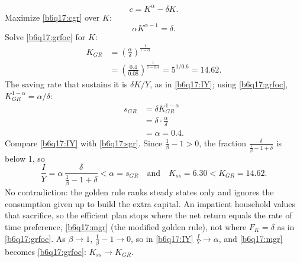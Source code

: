 \begin{sol}
\begin{equation}
c=K^\alpha-\delta K. \label{b6q17:cgr}
\end{equation}
Maximize \eqref{b6q17:cgr} over $K$:
\begin{equation}
\alpha K^{\alpha-1}=\delta. \label{b6q17:grfoc}
\end{equation}
Solve \eqref{b6q17:grfoc} for $K$:
\begin{align}
K_{GR}&=\left(\frac\alpha\delta\right)^{\frac1{1-\alpha}}\nonumber\\
&=\left(\frac{0.4}{0.08}\right)^{\frac1{1-0.4}}=5^{1/0.6}=14.62. \label{b6q17:Kgr}
\end{align}
The saving rate that sustains it is $\delta K/Y$, as in \eqref{b6q17:IY}; using \eqref{b6q17:grfoc}, $K_{GR}^{1-\alpha}=\alpha/\delta$:
\begin{align}
s_{GR}&=\delta K_{GR}^{1-\alpha}\nonumber\\
&=\delta\cdot\frac\alpha\delta\nonumber\\
&=\alpha=0.4. \label{b6q17:sgr}
\end{align}
Compare \eqref{b6q17:IY} with \eqref{b6q17:sgr}. Since $\frac1\beta-1>0$, the fraction $\frac{\delta}{\frac1\beta-1+\delta}$ is below 1, so
\[
\frac IY=\alpha\,\frac{\delta}{\frac1\beta-1+\delta}<\alpha=s_{GR}\quad\text{and}\quad K_{ss}=6.30<K_{GR}=14.62 .
\]
No contradiction: the golden rule ranks steady states only and ignores the consumption given up to build the extra capital. An
impatient household values that sacrifice, so the efficient plan stops where the net return equals the rate of time preference,
\eqref{b6q17:mgr} (the modified golden rule), not where $F_K=\delta$ as in \eqref{b6q17:grfoc}. As $\beta\to1$,
$\frac1\beta-1\to0$, so in \eqref{b6q17:IY} $\frac IY\to\alpha$, and \eqref{b6q17:mgr} becomes \eqref{b6q17:grfoc}: $K_{ss}\to K_{GR}$.
\end{sol}

